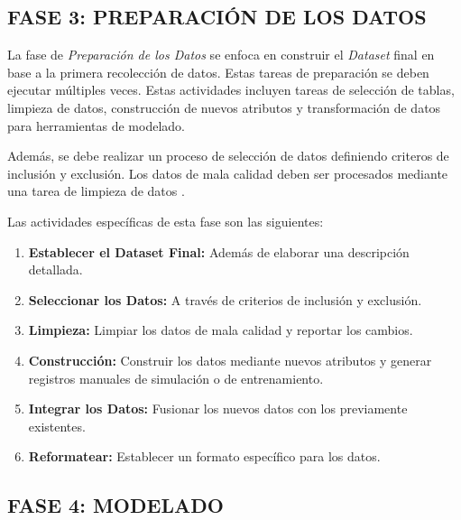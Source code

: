 \subsection{FASE 3: PREPARACIÓN DE LOS DATOS}

La fase de \textit{Preparación de los Datos} se enfoca en construir el \textit{Dataset} final en base a la primera recolección de datos. Estas tareas de preparación se deben ejecutar múltiples veces. Estas actividades incluyen tareas de selección de tablas, limpieza de datos, construcción de nuevos atributos y transformación de datos para herramientas de modelado.

Además, se debe realizar un proceso de selección de datos definiendo criteros de inclusión y exclusión. Los datos de mala calidad deben ser procesados mediante una tarea de limpieza de datos \parencite{schroer2021systematic}.

Las actividades específicas de esta fase son las siguientes:

\begin{enumerate}
    \item \textbf{Establecer el Dataset Final: } Además de elaborar una descripción detallada.
    \item \textbf{Seleccionar los Datos: } A través de criterios de inclusión y exclusión.
    \item \textbf{Limpieza:} Limpiar los datos de mala calidad y reportar los cambios.
    \item \textbf{Construcción:} Construir los datos mediante nuevos atributos y generar registros manuales de simulación o de entrenamiento.
    \item \textbf{Integrar los Datos:} Fusionar los nuevos datos con los previamente existentes.
    \item \textbf{Reformatear: } Establecer un formato específico para los datos.
\end{enumerate}

\subsection{FASE 4: MODELADO}

